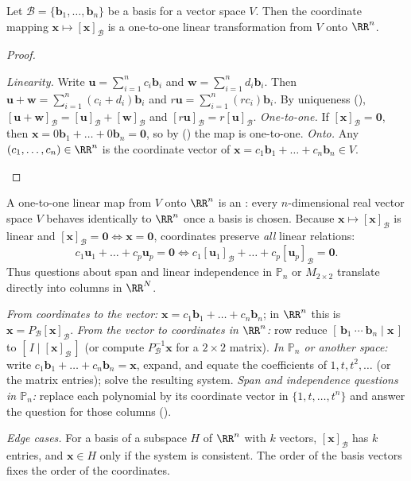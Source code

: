 \documentclass[10pt]{scrartcl}
\newcommand{\vv}[1]{\mathbf{#1}}
\begin{document}
\begin{theorem*}
  Let $\mathcal B=\{\vv b_1,\dots,\vv b_n\}$ be a basis for a vector space $V$. Then the coordinate mapping $\vv x\mapsto[\vv x]_{\mathcal B}$ is a one-to-one linear transformation from $V$ onto $\RR^n$.
\end{theorem*}
\begin{proof}
  \begin{steps}
    \ii \emph{Linearity.} Write $\vv u=\sum_{i=1}^n c_i\vv b_i$ and $\vv w=\sum_{i=1}^n d_i\vv b_i$. Then $\vv u+\vv w=\sum_{i=1}^n(c_i+d_i)\vv b_i$ and $r\vv u=\sum_{i=1}^n(rc_i)\vv b_i$. By uniqueness (), $[\vv u+\vv w]_{\mathcal B}=[\vv u]_{\mathcal B}+[\vv w]_{\mathcal B}$ and $[r\vv u]_{\mathcal B}=r[\vv u]_{\mathcal B}$.
    \ii \emph{One-to-one.} If $[\vv x]_{\mathcal B}=\vv 0$, then $\vv x=0\vv b_1+\dots+0\vv b_n=\vv 0$, so by () the map is one-to-one.
    \ii \emph{Onto.} Any $(c_1,\dots,c_n)\in\RR^n$ is the coordinate vector of $\vv x=c_1\vv b_1+\dots+c_n\vv b_n\in V$.
  \end{steps}
\end{proof}

A one-to-one linear map from $V$ onto $\RR^n$ is an : every $n$-dimensional real vector space $V$ behaves identically to $\RR^n$ once a basis is chosen. Because $\vv x\mapsto[\vv x]_{\mathcal B}$ is linear and $[\vv x]_{\mathcal B}=\vv 0\iff \vv x=\vv 0$, coordinates preserve \emph{all} linear relations:
\[
  c_1\vv u_1+\dots+c_p\vv u_p = \vv 0 \iff c_1[\vv u_1]_{\mathcal B}+\dots+c_p[\vv u_p]_{\mathcal B}=\vv 0.
\]
Thus questions about span and linear independence in $\mathbb P_n$ or $M_{2\times2}$ translate directly into columns in $\RR^N$.

\begin{steps}
  \ii \emph{From coordinates to the vector:} $\vv x=c_1\vv b_1+\dots+c_n\vv b_n$; in $\RR^n$ this is $\vv x=P_{\mathcal B}[\vv x]_{\mathcal B}$.
  \ii \emph{From the vector to coordinates in $\RR^n$:} row reduce $[\,\vv b_1\ \cdots\ \vv b_n\mid\vv x\,]$ to $[\,I\mid[\vv x]_{\mathcal B}\,]$ (or compute $P_{\mathcal B}^{-1}\vv x$ for a $2\times2$ matrix).
  \ii \emph{In $\mathbb P_n$ or another space:} write $c_1\vv b_1+\dots+c_n\vv b_n=\vv x$, expand, and equate the coefficients of $1,t,t^2,\dots$ (or the matrix entries); solve the resulting system.
  \ii \emph{Span and independence questions in $\mathbb P_n$:} replace each polynomial by its coordinate vector in $\{1,t,\dots,t^n\}$ and answer the question for those columns ().
\end{steps}
\emph{Edge cases.} For a basis of a subspace $H$ of $\RR^n$ with $k$ vectors, $[\vv x]_{\mathcal B}$ has $k$ entries, and $\vv x\in H$ only if the system is consistent. The order of the basis vectors fixes the order of the coordinates.
\end{document}
